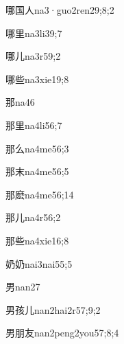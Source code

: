 \begin{verbete}{哪国人}{na3·guo2ren2}{9;8;2}
\end{verbete}
\begin{verbete}{哪里}{na3li3}{9;7}
\end{verbete}
\begin{verbete}{哪儿}{na3r5}{9;2}
\end{verbete}
\begin{verbete}{哪些}{na3xie1}{9;8}
\end{verbete}
\begin{verbete}{那}{na4}{6}
\end{verbete}
\begin{verbete}{那里}{na4li5}{6;7}
\end{verbete}
\begin{verbete}{那么}{na4me5}{6;3}
\end{verbete}
\begin{verbete}{那末}{na4me5}{6;5}
\end{verbete}
\begin{verbete}{那麽}{na4me5}{6;14}
\end{verbete}
\begin{verbete}{那儿}{na4r5}{6;2}
\end{verbete}
\begin{verbete}{那些}{na4xie1}{6;8}
\end{verbete}
\begin{verbete}{奶奶}{nai3nai5}{5;5}
\end{verbete}
\begin{verbete}{男}{nan2}{7}
\end{verbete}
\begin{verbete}{男孩儿}{nan2hai2r5}{7;9;2}
\end{verbete}
\begin{verbete}{男朋友}{nan2peng2you5}{7;8;4}
\end{verbete}
